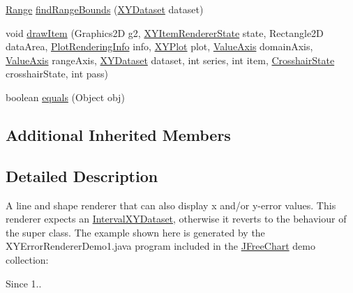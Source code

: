 \begin{DoxyCompactItemize}
\item 
\mbox{\hyperlink{classorg_1_1jfree_1_1data_1_1_range}{Range}} \mbox{\hyperlink{classorg_1_1jfree_1_1chart_1_1renderer_1_1xy_1_1_x_y_error_renderer_a3e48bd5bc9bb32456da3ff4a634b9fb3}{find\+Range\+Bounds}} (\mbox{\hyperlink{interfaceorg_1_1jfree_1_1data_1_1xy_1_1_x_y_dataset}{X\+Y\+Dataset}} dataset)
\item 
void \mbox{\hyperlink{classorg_1_1jfree_1_1chart_1_1renderer_1_1xy_1_1_x_y_error_renderer_a309d035f873ce603e9737ac86c62062b}{draw\+Item}} (Graphics2D g2, \mbox{\hyperlink{classorg_1_1jfree_1_1chart_1_1renderer_1_1xy_1_1_x_y_item_renderer_state}{X\+Y\+Item\+Renderer\+State}} state, Rectangle2D data\+Area, \mbox{\hyperlink{classorg_1_1jfree_1_1chart_1_1plot_1_1_plot_rendering_info}{Plot\+Rendering\+Info}} info, \mbox{\hyperlink{classorg_1_1jfree_1_1chart_1_1plot_1_1_x_y_plot}{X\+Y\+Plot}} plot, \mbox{\hyperlink{classorg_1_1jfree_1_1chart_1_1axis_1_1_value_axis}{Value\+Axis}} domain\+Axis, \mbox{\hyperlink{classorg_1_1jfree_1_1chart_1_1axis_1_1_value_axis}{Value\+Axis}} range\+Axis, \mbox{\hyperlink{interfaceorg_1_1jfree_1_1data_1_1xy_1_1_x_y_dataset}{X\+Y\+Dataset}} dataset, int series, int item, \mbox{\hyperlink{classorg_1_1jfree_1_1chart_1_1plot_1_1_crosshair_state}{Crosshair\+State}} crosshair\+State, int pass)
\item 
boolean \mbox{\hyperlink{classorg_1_1jfree_1_1chart_1_1renderer_1_1xy_1_1_x_y_error_renderer_a91d247b738957faa9acd6b3b8e90a75e}{equals}} (Object obj)
\end{DoxyCompactItemize}
\subsection*{Additional Inherited Members}


\subsection{Detailed Description}
A line and shape renderer that can also display x and/or y-\/error values. This renderer expects an \mbox{\hyperlink{}{Interval\+X\+Y\+Dataset}}, otherwise it reverts to the behaviour of the super class. The example shown here is generated by the {\ttfamily X\+Y\+Error\+Renderer\+Demo1.\+java} program included in the \mbox{\hyperlink{classorg_1_1jfree_1_1chart_1_1_j_free_chart}{J\+Free\+Chart}} demo collection\+: ~\newline
~\newline
 

\begin{DoxySince}{Since}
1.. 
\end{DoxySince}


